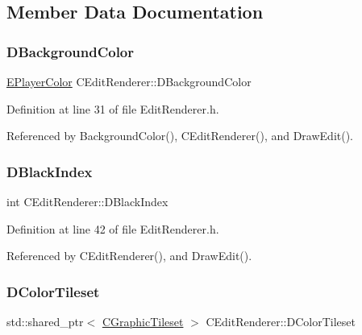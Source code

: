 \subsection{Member Data Documentation}
\hypertarget{classCEditRenderer_a7e5e1b18db4c53fe288c200aed673ccf}{}\label{classCEditRenderer_a7e5e1b18db4c53fe288c200aed673ccf} 
\subsubsection{\texorpdfstring{D\+Background\+Color}{DBackgroundColor}}
{\footnotesize\ttfamily \hyperlink{GameDataTypes_8h_aafb0ca75933357ff28a6d7efbdd7602f}{E\+Player\+Color} C\+Edit\+Renderer\+::\+D\+Background\+Color\hspace{0.3cm}{\ttfamily [protected]}}



Definition at line 31 of file Edit\+Renderer.\+h.



Referenced by Background\+Color(), C\+Edit\+Renderer(), and Draw\+Edit().

\hypertarget{classCEditRenderer_a13b03f02ff6673d8df2d6509c17bcccc}{}\label{classCEditRenderer_a13b03f02ff6673d8df2d6509c17bcccc} 
\subsubsection{\texorpdfstring{D\+Black\+Index}{DBlackIndex}}
{\footnotesize\ttfamily int C\+Edit\+Renderer\+::\+D\+Black\+Index\hspace{0.3cm}{\ttfamily [protected]}}



Definition at line 42 of file Edit\+Renderer.\+h.



Referenced by C\+Edit\+Renderer(), and Draw\+Edit().

\hypertarget{classCEditRenderer_a43dfa83f85527019c7499e33ecaed149}{}\label{classCEditRenderer_a43dfa83f85527019c7499e33ecaed149} 
\subsubsection{\texorpdfstring{D\+Color\+Tileset}{DColorTileset}}
{\footnotesize\ttfamily std\+::shared\+\_\+ptr$<$ \hyperlink{classCGraphicTileset}{C\+Graphic\+Tileset} $>$ C\+Edit\+Renderer\+::\+D\+Color\+Tileset\hspace{0.3cm}{\ttfamily [protected]}}



